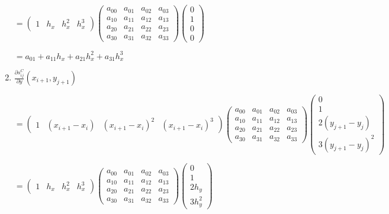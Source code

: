 \documentclass[11pt]{article}
\begin{document}
\begin{enumerate}[label=\textbf{\arabic*)}]
\begin{flushleft}
    $= \begin{pmatrix}
      1 & h_x & h_x^2 & h_x^3
    \end{pmatrix}
    \begin{pmatrix}
      a_{00}  & a_{01} & a_{02} & a_{03} \\
      a_{10}  & a_{11} & a_{12} & a_{13} \\
      a_{20}  & a_{21} & a_{22} & a_{23} \\
      a_{30}  & a_{31} & a_{32} & a_{33}
    \end{pmatrix}
    \begin{pmatrix}
      0  \\
      1  \\
      0  \\
      0
    \end{pmatrix}$

    $= a_{01} + a_{11}h_x + a_{21}h_x^2 + a_{31}h_x^3$
    \end{flushleft}

    \item $\frac{\partial s_{ij}^C}{\partial y}(x_{i + 1}, y_{j + 1})$

    \begin{flushleft}
    $= \begin{pmatrix}
      1 & (x_{i + 1} - x_i) & (x_{i + 1} - x_i)^2 & (x_{i + 1} - x_i)^3
    \end{pmatrix}
    \begin{pmatrix}
      a_{00}  & a_{01} & a_{02} & a_{03} \\
      a_{10}  & a_{11} & a_{12} & a_{13} \\
      a_{20}  & a_{21} & a_{22} & a_{23} \\
      a_{30}  & a_{31} & a_{32} & a_{33}
    \end{pmatrix}
    \begin{pmatrix}
      0  \\
      1 \\
      2(y_{j + 1} - y_j)  \\
      3(y_{j + 1} - y_j)^2
    \end{pmatrix}$


    $= \begin{pmatrix}
      1 & h_x & h_x^2 & h_x^3
    \end{pmatrix}
    \begin{pmatrix}
      a_{00}  & a_{01} & a_{02} & a_{03} \\
      a_{10}  & a_{11} & a_{12} & a_{13} \\
      a_{20}  & a_{21} & a_{22} & a_{23} \\
      a_{30}  & a_{31} & a_{32} & a_{33}
    \end{pmatrix}
    \begin{pmatrix}
      0  \\
      1  \\
      2h_y  \\
      3h_y^2
    \end{pmatrix}$


\end{flushleft}
\end{enumerate}
\end{document}

